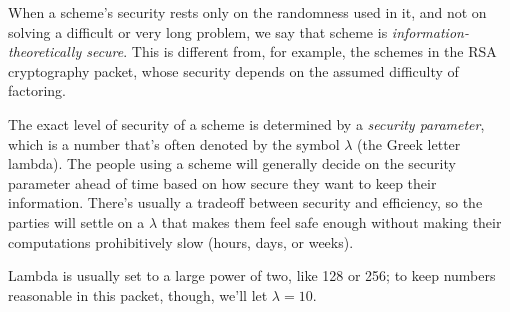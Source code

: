 When a scheme's security rests only on the randomness used in it, and not on 
solving a difficult or very long problem, we say that scheme is
\emph{information-theoretically secure}. This is different from, for example,
the schemes in the RSA cryptography packet, whose security depends on 
the assumed difficulty of factoring\footnotemark.


The exact level of security of a scheme is determined by a \emph{security 
parameter}, which is a number that's often denoted by the symbol $\lambda$ 
(the Greek letter lambda). The people using a scheme will generally decide 
on the security parameter ahead of time based on how secure they want to
keep their information. 
There's usually a tradeoff between security and efficiency, so the 
parties will settle on a $\lambda$ that makes them feel safe enough without 
making their computations prohibitively slow (hours, days, or weeks).

Lambda is usually set to a large power of two, like 128 or 256; to keep 
numbers reasonable in this packet, though, we'll let $\lambda=10$.
